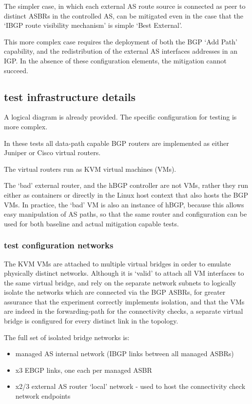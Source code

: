 The simpler case, in which each external AS route source is connected as peer to distinct ASBRs in the controlled AS, can be mitigated even in the case that the `IBGP route visibility mechanism' is simple `Best External'.

This more complex case requires the deployment of both the BGP `Add Path' capability, and the redistribution of the external AS interfaces addresses in an IGP.  In the absence of these configuration elements, the mitigation cannot succeed.

\subsection{test infrastructure details}

A logical diagram is already provided.  The specific configuration for testing is more complex.

In these tests all data-path capable BGP routers are implemented as either Juniper or Cisco virtual routers.

The virtual routers run as KVM virtual machines (VMs).

The `bad' external router, and the hBGP controller are not VMs, rather they run either as containers or directly in the Linux host context that also hosts the BGP VMs.  In practice, the `bad' VM is also an instance of hBGP, because this allows easy manipulation of AS paths, so that the same router and configuration can be used for both baseline and actual mitigation capable tests.

\subsubsection{test configuration networks}
The KVM VMs are attached to multiple virtual bridges in order to emulate physically distinct networks.
Although it is `valid' to attach all VM interfaces to the same virtual bridge, and rely on the separate network subnets to logically isolate the networks which are connected via the BGP ASBRs, for greater assurance that the experiment correctly implements isolation, and that the VMs are indeed in the forwarding-path for the connectivity checks, a separate virtual bridge is configured for every distinct link in the topology.

The full set of isolated bridge networks is:
\begin{itemize}
    \item managed AS internal network (IBGP links between all managed ASBRs)
    \item x3 EBGP links, one each per managed ASBR
    \item x2/3 external AS router `local' network - used to host the connectivity check network endpoints
\end{itemize}

